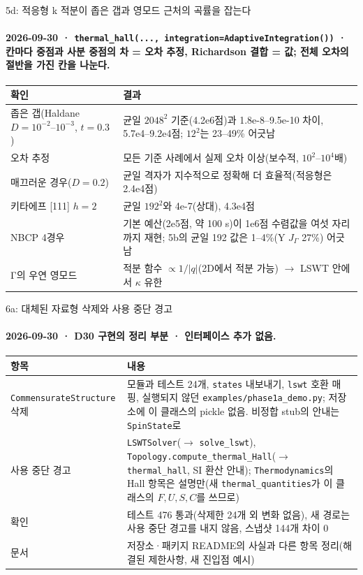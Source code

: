 \begin{frame}[label=stage5d]{5d: 적응형 k 적분이 좁은 갭과 영모드 근처의 곡률을 잡는다}
  \framesubtitle{2026-09-30 · \texttt{thermal\_hall(..., integration=AdaptiveIntegration())} · 칸마다 중점과 사분 중점의 차 = 오차 추정, Richardson 결합 = 값; 전체 오차의 절반을 가진 칸을 나눈다.}
  \footnotesize\renewcommand{\arraystretch}{1.06}
  \begin{tabularx}{\textwidth}{@{}P{3.3cm}Y@{}}
    \toprule
    확인 & 결과 \\
    \midrule
    좁은 갭(Haldane $D=10^{-2}$--$10^{-3}$, $t=0.3$) & 균일 $2048^2$ 기준(4.2e6점)과 1.8e-8--9.5e-10 차이, 5.7e4--9.2e4점; $12^2$는 23--49\% 어긋남 \\
    오차 추정 & 모든 기준 사례에서 실제 오차 이상(보수적, $10^2$--$10^4$배) \\
    매끄러운 경우($D=0.2$) & 균일 격자가 지수적으로 정확해 더 효율적(적응형은 2.4e4점) \\
    키타에프 [111] $h=2$ & 균일 $192^2$와 4e-7(상대), 4.3e4점 \\
    NBCP 4경우 & 기본 예산(2e5점, 약 100 s)이 1e6점 수렴값을 여섯 자리까지 재현; 5b의 균일 192 값은 1--4\%(Y $J_\Gamma$ 27\%) 어긋남 \\
    Γ의 우연 영모드 & 적분 함수 $\propto1/|q|$(2D에서 적분 가능) $\to$ LSWT 안에서 $\kappa$ 유한 \\
    \bottomrule
  \end{tabularx}
  \par\smallskip
\end{frame}

\begin{frame}[label=stage6a]{6a: 대체된 자료형 삭제와 사용 중단 경고}
  \framesubtitle{2026-09-30 · D30 구현의 정리 부분 · 인터페이스 추가 없음.}
  \footnotesize\renewcommand{\arraystretch}{1.08}
  \begin{tabularx}{\textwidth}{@{}P{3.2cm}Y@{}}
    \toprule
    항목 & 내용 \\
    \midrule
    \texttt{CommensurateStructure} 삭제 & 모듈과 테스트 24개, \texttt{states} 내보내기, \texttt{lswt} 호환 매핑, 실행되지 않던 \texttt{examples/phase1a\_demo.py}; 저장소에 이 클래스의 pickle 없음. 비정합 stub의 안내는 \texttt{SpinState}로 \\
    사용 중단 경고 & \texttt{LSWTSolver}($\to$ \texttt{solve\_lswt}), \texttt{Topology.compute\_thermal\_Hall}($\to$ \texttt{thermal\_hall}, SI 환산 안내); \texttt{Thermodynamics}의 Hall 항목은 설명만(새 \texttt{thermal\_quantities}가 이 클래스의 $F,U,S,C$를 쓰므로) \\
    확인 & 테스트 476 통과(삭제한 24개 외 변화 없음), 새 경로는 사용 중단 경고를 내지 않음, 스냅샷 144개 차이 0 \\
    문서 & 저장소·패키지 README의 사실과 다른 항목 정리(해결된 제한사항, 새 진입점 예시) \\
    \bottomrule
  \end{tabularx}
\end{frame}


